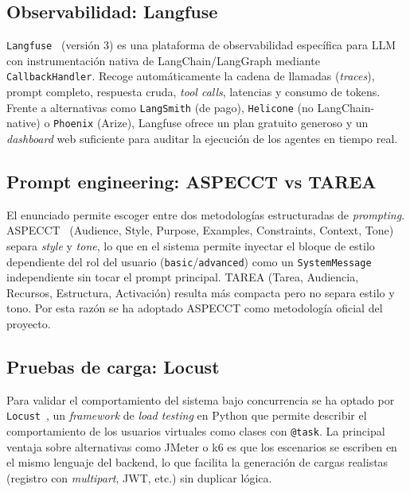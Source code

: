 \subsection{Observabilidad: Langfuse}

\texttt{Langfuse}~\cite{langfuse} (versión 3) es una plataforma de
observabilidad específica para LLM con instrumentación nativa de
LangChain/LangGraph mediante \texttt{CallbackHandler}. Recoge
automáticamente la cadena de llamadas (\textit{traces}), prompt
completo, respuesta cruda, \textit{tool calls}, latencias y consumo
de tokens. Frente a alternativas como \texttt{LangSmith} (de pago),
\texttt{Helicone} (no LangChain-native) o \texttt{Phoenix} (Arize),
Langfuse ofrece un plan gratuito generoso y un \textit{dashboard} web
suficiente para auditar la ejecución de los agentes en tiempo real.

\subsection{Prompt engineering: ASPECCT vs TAREA}

El enunciado permite escoger entre dos metodologías estructuradas de
\textit{prompting}. ASPECCT~\cite{aspect} (Audience, Style, Purpose,
Examples, Constraints, Context, Tone) separa \textit{style} y
\textit{tone}, lo que en el sistema permite inyectar el bloque de
estilo dependiente del rol del usuario
(\texttt{basic}/\texttt{advanced}) como un \texttt{SystemMessage}
independiente sin tocar el prompt principal. TAREA (Tarea, Audiencia,
Recursos, Estructura, Activación) resulta más compacta pero no separa
estilo y tono. Por esta razón se ha adoptado ASPECCT como metodología
oficial del proyecto.

\subsection{Pruebas de carga: Locust}

Para validar el comportamiento del sistema bajo concurrencia se ha
optado por \texttt{Locust}~\cite{locust}, un \textit{framework} de
\textit{load testing} en Python que permite describir el
comportamiento de los usuarios virtuales como clases con \texttt{@task}.
La principal ventaja sobre alternativas como JMeter o k6 es que los
escenarios se escriben en el mismo lenguaje del backend, lo que
facilita la generación de cargas realistas (registro con
\textit{multipart}, JWT, etc.) sin duplicar lógica.
